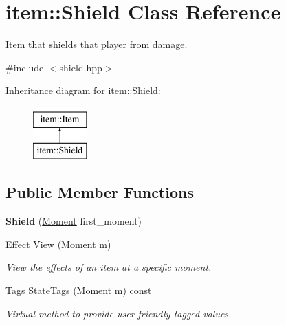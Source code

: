\hypertarget{classitem_1_1_shield}{}\section{item\+:\+:Shield Class Reference}
\label{classitem_1_1_shield}


\hyperlink{classitem_1_1_item}{Item} that shields that player from damage.  




{\ttfamily \#include $<$shield.\+hpp$>$}

Inheritance diagram for item\+:\+:Shield\+:\begin{figure}[H]
\begin{center}
\leavevmode
\includegraphics[height=2.000000cm]{classitem_1_1_shield}
\end{center}
\end{figure}
\subsection*{Public Member Functions}
\begin{DoxyCompactItemize}
\item 
\mbox{\label{classitem_1_1_shield_ac65eef60e78829da35895968923fb3b7}} 
{\bfseries Shield} (\hyperlink{classtimeplane_1_1_moment}{Moment} first\+\_\+moment)
\item 
\hyperlink{classitem_1_1_effect}{Effect} \hyperlink{classitem_1_1_shield_abdc88bd6d0a4d6021805fa3097f47633}{View} (\hyperlink{classtimeplane_1_1_moment}{Moment} m)
\begin{DoxyCompactList}\small\item\em View the effects of an item at a specific moment. \end{DoxyCompactList}\item 
Tags \hyperlink{classitem_1_1_shield_a91b92d4e1fca7015b75142d43f43e80e}{State\+Tags} (\hyperlink{classtimeplane_1_1_moment}{Moment} m) const
\begin{DoxyCompactList}\small\item\em Virtual method to provide user-\/friendly tagged values. \end{DoxyCompactList}\end{DoxyCompactItemize}
